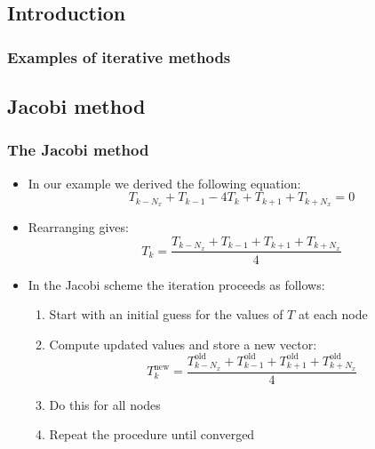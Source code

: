 \subsection*{Introduction}

\begin{frame}[fragile]
  \frametitle{Examples of iterative methods}
\end{frame}

\subsection*{Jacobi method}
\begin{frame}[fragile]
  \frametitle{The Jacobi method}
  \begin{itemize}
     \item In our example we derived the following equation:
    \[
     T_{k-N_x} + T_{k-1} - 4T_k + T_{k+1} + T_{k+N_x} = 0
    \]
    \item Rearranging gives:
    \[
      T_k = \frac{T_{k-N_x} + T_{k-1} + T_{k+1} + T_{k+N_x}}{4}
    \]\pause
    \item In the Jacobi scheme the iteration proceeds as follows:
    \begin{enumerate}
      \setlength{\itemindent}{1cm}
      \item Start with an initial guess for the values of $T$ at each node\pause
      \item Compute updated values and store a new vector:
        \[
          T_k^\text{new} = \frac{T_{k-N_x}^\text{old} + T_{k-1}^\text{old} + T_{k+1}^\text{old} + T_{k+N_x}^\text{old}}{4}
        \]\pause
      \item Do this for all nodes\pause
      \item Repeat the procedure until converged
    \end{enumerate}
  \end{itemize}
\end{frame}

